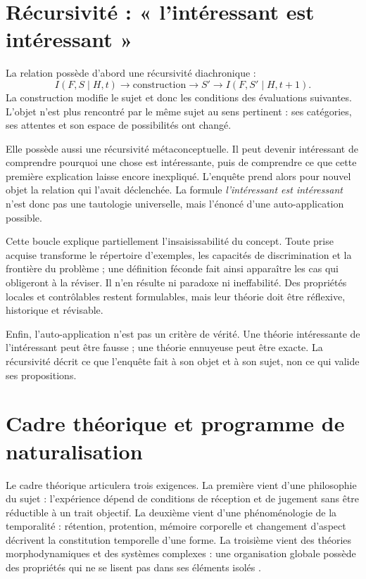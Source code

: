 \documentclass[11pt,a4paper]{article}
\begin{document}
\section{Récursivité : « l'intéressant est intéressant »}

La relation possède d'abord une récursivité diachronique :
\[
  I(F,S\mid H,t)\longrightarrow
  \text{construction}\longrightarrow S'
  \longrightarrow I(F,S'\mid H,t+1).
\]
La construction modifie le sujet et donc les conditions des évaluations
suivantes. L'objet n'est plus rencontré par le même sujet au sens pertinent :
ses catégories, ses attentes et son espace de possibilités ont changé.

Elle possède aussi une récursivité métaconceptuelle. Il peut devenir intéressant
de comprendre pourquoi une chose est intéressante, puis de comprendre ce que
cette première explication laisse encore inexpliqué. L'enquête prend alors pour
nouvel objet la relation qui l'avait déclenchée. La formule
\emph{l'intéressant est intéressant} n'est donc pas une tautologie universelle,
mais l'énoncé d'une auto-application possible.

Cette boucle explique partiellement l'insaisissabilité du concept. Toute prise
acquise transforme le répertoire d'exemples, les capacités de discrimination et
la frontière du problème ; une définition féconde fait ainsi apparaître les cas
qui obligeront à la réviser. Il n'en résulte ni paradoxe ni ineffabilité. Des
propriétés locales et contrôlables restent formulables, mais leur théorie doit
être réflexive, historique et révisable.

Enfin, l'auto-application n'est pas un critère de vérité. Une théorie
intéressante de l'intéressant peut être fausse ; une théorie ennuyeuse peut être
exacte. La récursivité décrit ce que l'enquête fait à son objet et à son sujet,
non ce qui valide ses propositions.

\section{Cadre théorique et programme de naturalisation}

Le cadre théorique articulera trois exigences. La première vient d'une
philosophie du sujet : l'expérience dépend de conditions de réception et de
jugement sans être réductible à un trait objectif. La deuxième vient d'une
phénoménologie de la temporalité : rétention, protention, mémoire corporelle et
changement d'aspect décrivent la constitution temporelle d'une forme. La
troisième vient des théories morphodynamiques et des systèmes complexes : une
organisation globale possède des propriétés qui ne se lisent pas dans ses
éléments isolés
\parencite{petitot1993phenomenologie,petitot2002naturaliser}.
\end{document}
